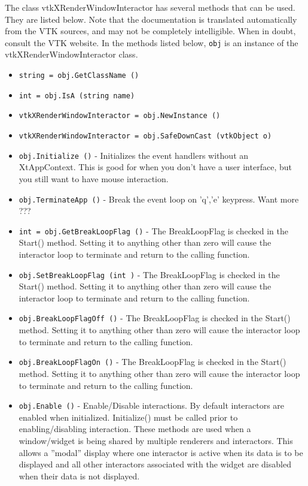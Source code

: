 The class vtkXRenderWindowInteractor has several methods that can be used.
  They are listed below.
Note that the documentation is translated automatically from the VTK sources,
and may not be completely intelligible.  When in doubt, consult the VTK website.
In the methods listed below, \verb|obj| is an instance of the vtkXRenderWindowInteractor class.
\begin{itemize}
\item  \verb|string = obj.GetClassName ()|

\item  \verb|int = obj.IsA (string name)|

\item  \verb|vtkXRenderWindowInteractor = obj.NewInstance ()|

\item  \verb|vtkXRenderWindowInteractor = obj.SafeDownCast (vtkObject o)|

\item  \verb|obj.Initialize ()| -  Initializes the event handlers without an XtAppContext.  This is
 good for when you don't have a user interface, but you still
 want to have mouse interaction.

\item  \verb|obj.TerminateApp ()| -  Break the event loop on 'q','e' keypress. Want more ???

\item  \verb|int = obj.GetBreakLoopFlag ()| -  The BreakLoopFlag is checked in the Start() method.
 Setting it to anything other than zero will cause
 the interactor loop to terminate and return to the
 calling function.

\item  \verb|obj.SetBreakLoopFlag (int )| -  The BreakLoopFlag is checked in the Start() method.
 Setting it to anything other than zero will cause
 the interactor loop to terminate and return to the
 calling function.

\item  \verb|obj.BreakLoopFlagOff ()| -  The BreakLoopFlag is checked in the Start() method.
 Setting it to anything other than zero will cause
 the interactor loop to terminate and return to the
 calling function.

\item  \verb|obj.BreakLoopFlagOn ()| -  The BreakLoopFlag is checked in the Start() method.
 Setting it to anything other than zero will cause
 the interactor loop to terminate and return to the
 calling function.

\item  \verb|obj.Enable ()| -  Enable/Disable interactions.  By default interactors are enabled when
 initialized.  Initialize() must be called prior to enabling/disabling
 interaction. These methods are used when a window/widget is being
 shared by multiple renderers and interactors.  This allows a ''modal''
 display where one interactor is active when its data is to be displayed
 and all other interactors associated with the widget are disabled
 when their data is not displayed.


\end{itemize}
